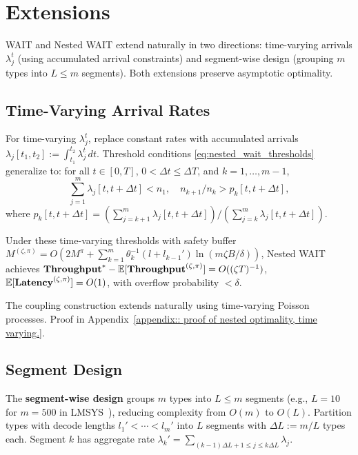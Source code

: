 \section{Extensions}\label{sec:extension}

WAIT and Nested WAIT extend naturally in two directions: time-varying arrivals $\lambda_j^t$ (using accumulated arrival constraints) and segment-wise design (grouping $m$ types into $L \leq m$ segments). Both extensions preserve asymptotic optimality.

\subsection{Time-Varying Arrival Rates}\label{sec:time_varying}

For time-varying $\lambda_j^t$, replace constant rates with accumulated arrivals $\lambda_j[t_1, t_2] := \int_{t_1}^{t_2} \lambda_j^t \, dt$. Threshold conditions \eqref{eq:nested_wait_thresholds} generalize to: for all $t\in [0, T]$, $0<\Delta t\leq \Delta T$, and $k = 1, \dots, m-1$,
\begin{equation}
    \label{eq:nested_wait_thresholds_time_varying}
    \sum_{j=1}^m \lambda_j[t, t + \Delta t] < n_1, \quad n_{k+1}/n_k > p_k[t,t+\Delta t],
\end{equation}
where $p_k[t,t+\Delta t] = (\sum_{j=k+1}^m\lambda_j[t,t+\Delta t])/(\sum_{j=k}^m\lambda_j[t,t+\Delta t])$.

\begin{theorem}
\label{thm:nested_wait_heavy_traffic_time_varying}
Under these time-varying thresholds with safety buffer $M^{(\zeta,\pi)} = O( 2M^\pi + \sum_{k=1}^m \theta_k^{-1}  (l + l_{k-1}') \ln( m \zeta B/\delta ))$, Nested WAIT achieves $\textbf{Throughput}^* - \mathbb{E}[ \textbf{Throughput}^{(\zeta, \pi)}] = O((\zeta T)^{-1})$, $\mathbb{E}[\textbf{Latency}^{(\zeta, \pi)}] = O(1)$, with overflow probability $< \delta$.
\end{theorem}

The coupling construction extends naturally using time-varying Poisson processes. Proof in Appendix~\ref{appendix:: proof of nested optimality, time varying.}.

\subsection{Segment Design}\label{sec:segment_design}

The \textbf{segment-wise design} groups $m$ types into $L \leq m$ segments (e.g., $L=10$ for $m=500$ in LMSYS~\cite{zheng2023lmsys}), reducing complexity from $O(m)$ to $O(L)$. Partition types with decode lengths $l_1' < \cdots < l_m'$ into $L$ segments with $\Delta L:= m/L$ types each. Segment $k$ has aggregate rate $\lambda_k' = \sum_{(k-1)\Delta L+1\le j\le k\Delta L} \lambda_j$.

